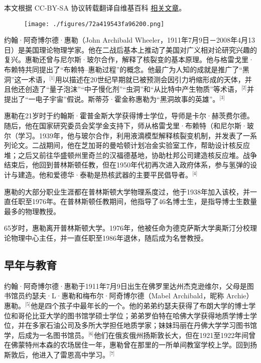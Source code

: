 
本文根据 CC-BY-SA 协议转载翻译自维基百科 \href{https://en.wikipedia.org/wiki/John_Archibald_Wheeler}{相关文章}。

\begin{figure}[ht]
\centering
\texttt{[image: ./figures/72a419543fa96200.png]}
\caption{} \label{fig_YHhl_4}
\end{figure}
约翰·阿奇博尔德·惠勒（John Archibald Wheeler，1911年7月9日－2008年4月13日）是美国理论物理学家。他在二战后基本上推动了美国对广义相对论研究兴趣的复兴。惠勒还曾与尼尔斯·玻尔合作，解释了核裂变的基本原理。他与格雷戈里·布赖特共同提出了“布赖特–惠勒过程”的概念。他最广为人知的成就是推广了“黑洞”这一术语，\(^\text{[1]}\)用以描述在20世纪早期就已被预测会因引力坍缩形成的天体，并且他还创造了“量子泡沫”“中子慢化剂”“虫洞”和“从比特中产生物质”等术语，\(^\text{[2]}\)并提出了“一电子宇宙”假说。斯蒂芬·霍金称惠勒为“黑洞故事的英雄”。\(^\text{[3]}\)

惠勒在21岁时于约翰斯·霍普金斯大学获得博士学位，导师是卡尔·赫茨费尔德。随后，他在国家研究委员会奖学金支持下，师从格雷戈里·布赖特（和尼尔斯·玻尔（学习。1939年，他与玻尔合作，利用液滴模型解释核裂变机制，并发表了一系列论文。二战期间，他在芝加哥的曼哈顿计划冶金实验室工作，帮助设计核反应堆；之后又前往华盛顿州里奇兰的汉福德基地，协助杜邦公司建造核反应堆。战争结束后，他回到普林斯顿任教，但在1950年代初再次进入政府体系，参与氢弹的设计与建造。他和爱德华·泰勒是热核武器的主要平民倡导者。\(^\text{[4]}\)

惠勒的大部分职业生涯都在普林斯顿大学物理系度过，他于1938年加入该校，并一直任职至1976年。在普林斯顿任教期间，他指导了46名博士生，是指导博士生数量最多的物理教授。

65岁时，惠勒离开普林斯顿大学。1976年，他被任命为德克萨斯大学奥斯汀分校理论物理中心主任，并一直任职至1986年退休，随后成为名誉教授。
\subsection{早年与教育}
约翰·阿奇博尔德·惠勒于1911年7月9日出生在佛罗里达州杰克逊维尔，父母是图书馆员约瑟夫·L·惠勒和梅布尔·阿奇博尔德（Mabel Archibald，昵称 Archie）惠勒。\(^\text{[5]}\)他是四个孩子中最年长的一个。他的弟弟约瑟夫获得了布朗大学的博士学位和哥伦比亚大学的图书馆学硕士学位；弟弟罗伯特在哈佛大学获得地质学博士学位，并在多家石油公司及多所大学担任地质学家；妹妹玛丽在丹佛大学学习图书馆学，后成为一名图书馆员。\(^\text{[6]}\)他们在俄亥俄州扬斯敦长大，但在1921至1922年间曾在佛蒙特州本森的农场居住一年，惠勒曾在那里的一所单间教室学校上学。回到扬斯敦后，他进入了雷恩高中学习。\(^\text{[7]}\)

